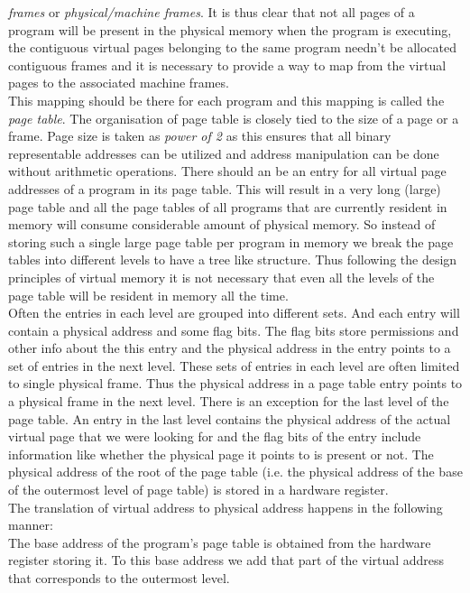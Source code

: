 \textit{frames} or \textit{physical/machine frames}. It is thus clear that not all pages of a
program will be present in the physical memory when the program is executing, the contiguous
virtual pages belonging to the same program needn't be allocated contiguous frames and it is
necessary to provide a way to map from the virtual pages to the associated machine frames.\\
This mapping should be there for each program and this mapping is called the \textit{page table}.
The organisation of page table is closely tied to the size of a page or a frame. Page size is
taken as \textit{power of 2} as this ensures that all binary representable addresses can be
utilized and address manipulation can be done without arithmetic operations. There should an be an
entry for all virtual page addresses of a program in its page table. This will result in a very
long (large) page table and all the page tables of all programs that are currently resident in
memory will consume considerable amount of physical memory. So instead of storing such a single
large page table per program in memory we break the page tables into different levels to have a
tree like structure. Thus following the design principles of virtual memory it is not necessary
that even all the levels of the page table will be resident in memory all the time.\\
Often the entries in each level are grouped into different sets. And each entry will contain a
physical address and some flag bits. The flag bits store permissions and other info about the this
entry and the physical address in the entry points to a set of entries in the next level. These
sets of entries in each level are often limited to single physical frame. Thus the physical
address in a page table entry points to a physical frame in the next level. There is an exception
for the last level of the page table. An entry in the last level contains the physical address of
the actual virtual page that we were looking for and the flag bits of the entry include
information like whether the physical page it points to is present or not. The physical address of
the root of the page table (i.e. the physical address of the base of the outermost level of page
table) is stored in a hardware register.\\
The translation of virtual address to physical address happens in the following manner:\\
The base address of the program's page table is obtained from the hardware register storing it. To
this base address we add that part of the virtual address that corresponds to the outermost level. 
